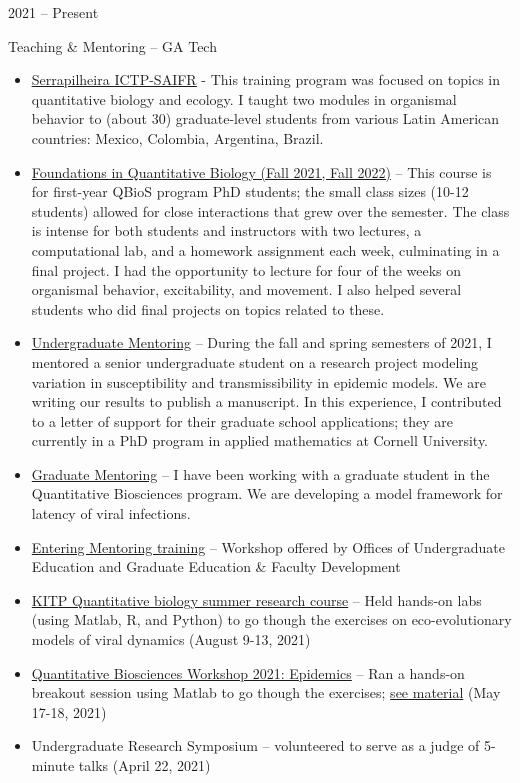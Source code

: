 \documentclass[a4paper,10pt]{article}
\newlength{\cvcolumngapwidth}
\newlength{\cvleftcolumnwidth}
\newlength{\cvrightcolumnwidth}
\newcommand{\cvtitlestyle}[1]{{\large\cvtitlefont\textcolor{cvtitlecolor}{#1}}}
\newcommand{\cvheadingstyle}[1]{{\normalsize\cvheadingfont\textcolor{cvheadingcolor}{#1}}}
\newlength{\cvafteritemskipamount}
\newlength{\cvaftertitleskipamount}
\newlength{\cvparskip}
\newcommand{\cvitem}[2]{
            \begin{minipage}[t]{\cvleftcolumnwidth}
                \raggedleft #1
            \end{minipage}%
            \hspace{\cvcolumngapwidth}%
            \begin{minipage}[t]{\cvrightcolumnwidth}
                \setlength{\parskip}{\cvparskip} #2
            \end{minipage}
        
            \vspace{\cvafteritemskipamount}
        }
\newcommand{\cvtitle}[1]{
            \cvtitlestyle{#1}
        
            \vspace{\cvaftertitleskipamount}
            \vspace{-\cvparskip}
        }
\begin{document}
	\cvitem{
            \cvheadingstyle{2021 -- Present}
        }{
            \cvtitle{Teaching \& Mentoring -- GA Tech}
            \begin{itemize}[leftmargin=*]
            	\item \href{https://www.ictp-saifr.org/qbioprogram/}{\underline{Serrapilheira ICTP-SAIFR}} -  This training program was focused on topics in quantitative biology and ecology. I taught two modules in organismal behavior to (about 30) graduate-level students from various Latin American countries: Mexico, Colombia, Argentina, Brazil.
                \item \underline{Foundations in Quantitative Biology (Fall 2021, Fall 2022)} -- This course is for first-year QBioS program PhD students; the small class sizes (10-12 students) allowed for close interactions that grew over the semester. The class is intense for both students and instructors with two lectures, a computational lab, and a homework assignment each week, culminating in a final project. I had the opportunity to lecture for four of the weeks on organismal behavior, excitability, and movement. I also helped several students who did final projects on topics related to these.
                \item  \underline{Undergraduate Mentoring} -- During the fall and spring semesters of 2021, I mentored a senior undergraduate student on a research project modeling variation in susceptibility and transmissibility in epidemic models. We are writing our results to publish a manuscript. In this experience, I contributed to a letter of support for their graduate school applications; they are currently in a PhD program in applied mathematics at Cornell University.
                \item  \underline{Graduate Mentoring} -- I have been working with a graduate student in the Quantitative Biosciences program. We are developing a model framework for latency of viral infections.
                \item  \underline{Entering Mentoring training} -- Workshop offered by Offices of Undergraduate Education and Graduate Education \& Faculty Development
                   \item \href{https://www.kitp.ucsb.edu/qbio}{KITP Quantitative biology summer research course} -- Held hands-on labs (using Matlab, R, and Python) to go though the exercises on eco-evolutionary models of viral dynamics  (August 9-13, 2021)
    	\item \href{https://workshop2021.qbios.gatech.edu/schedule/}{Quantitative Biosciences Workshop 2021: Epidemics} -- Ran a hands-on breakout session using Matlab to go though the exercises; \href{https://github.com/Jeremy-D-Harris/qBiosWorkshop2021_TeamOutbreak}{see material} (May 17-18, 2021)
    	\item Undergraduate Research Symposium -- volunteered to serve as a judge of 5-minute talks (April 22, 2021)

            \end{itemize}
        }
                
\end{document}

